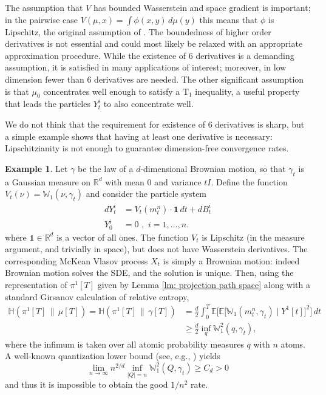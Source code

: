 \documentclass[11pt,reqno]{amsart}
\numberwithin{equation}{section}
\theoremstyle{definition}
\newtheorem{example}[theorem]{Example}
\def\E{{\mathbb E}}
\def\R{{\mathbb R}}
\newcommand{\W}{\mathbb W}
\newcommand{\ent}{ \mathbb H}
\begin{document}
The assumption that $V$ has bounded Wasserstein and space gradient is important; in the pairwise case $ V(\mu,x)=\int \phi(x,y)\,d\mu(y)$ this means that $\phi$ is Lipschitz, the original assumption of \cite{HierarchiesPaper}. The boundedness of higher order derivatives is not essential and could most likely be relaxed with an appropriate approximation procedure. While the existence of $6$ derivatives is a demanding assumption, it is satisfied in many applications of interest; moreover, in low dimension fewer than $6$ derivatives are needed.
The other significant assumption is that $\mu_0$ concentrates well enough to satisfy a T$_1$ inequality, a useful property that leads the particles $Y_t^i$ to also concentrate well.


We do not think that the requirement for existence of $6$ derivatives is sharp, but a simple example shows that having at least one derivative is necessary: Lipschitzianity is not enough to guarantee dimension-free convergence rates.
\begin{example}
\label{example}
    Let $\gamma$ be the law of a $d$-dimensional Brownian motion, so that $\gamma_t$ is a Gaussian measure on $\R^d$ with mean 0 and variance $tI$. Define the function $ V_t(\nu)=\W_1(\nu,\gamma_t)$ and consider the particle system 
    \begin{align*}
        dY_t^i &=  V_t(m_t^n)\cdot\mathbf 1\,dt+dB_t^i\\
        Y_0^i&=0\,\,,\,\, i=1,\dots,n.
    \end{align*}
    where $\mathbf 1\in \R^d$ is a vector of all ones. The function $ V_t$ is Lipschitz (in the measure argument, and trivially in space), but does not have Wasserstein derivatives. The corresponding McKean Vlasov process $X_t$ is simply a Brownian motion: indeed Brownian motion solves the SDE, and the solution is unique. Then, using the representation of $\pi^1[T]$ given by Lemma \ref{lm: projection path space} along with a standard Girsanov calculation of relative entropy, 
    \begin{align*}
\ent(\pi^1[T]\,\|\,\mu[T]) =\ent(\pi^1[T]\,\|\,\gamma[T]) &=\frac d2\int_0^T \E\Big[\E\big[\W_1(m_t^n,\gamma_t)\mid Y^1[t]\big]^2\Big]\,dt\\
&\geq \frac d2 \inf_{q} \W_1^2(q,\gamma_t),
    \end{align*}
    where the infimum is taken over all atomic probability measures $q$ with $n$ atoms. A well-known quantization lower bound  (see, e.g., \cite[Theorem 2.1]{Quantization})  yields
    \[\lim_{n\to \infty} n^{2/d}\inf_{|Q|=n} \W_1^2(Q,\gamma_t) \geq C_d>0\]
    and thus it is impossible to obtain the good $1/n^2$ rate.
\end{example}
\end{document}
